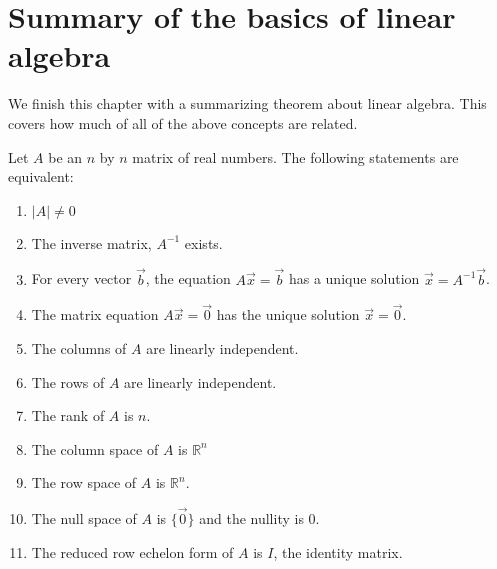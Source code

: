 \section{Summary of the basics of  linear algebra}
\label{sect:linear:algebra:summary}

We finish this chapter with a summarizing theorem about linear algebra.   This covers how much of all of the above concepts are related.



\begin{theorem} \label{thm:nonsing:matrices}
 Let $A$ be an $n$ by $n$ matrix of real numbers.   The following statements are equivalent:

\begin{enumerate}
 \item $|A| \neq 0$
 \item The inverse matrix, $A^{-1}$ exists.
 \item For every vector $\vec{b}$, the equation $A \vec{x}=\vec{b}$ has a unique solution $\vec{x} = A^{-1} \vec{b}$.
 \item The matrix equation $A \vec{x} = \vec{0}$ has the unique solution $\vec{x} = \vec{0}$.
 \item The columns of $A$ are linearly independent.
 \item The rows of $A$ are linearly independent.
 \item The rank of $A$ is $n$.
 \item The column space of $A$ is $\mathbb{R}^n$
 \item The row space of $A$ is $\mathbb{R}^n$.
 \item The null space of $A$ is $\{\vec{0}\}$ and the nullity is 0.
 \item The reduced row echelon form of $A$ is $I$, the identity matrix.
\end{enumerate}
\end{theorem}

